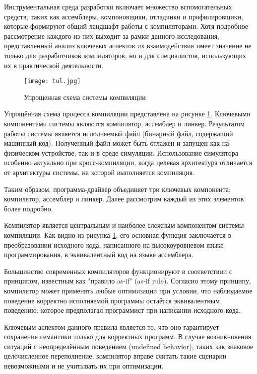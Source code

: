 Инструментальная среда разработки включает множество вспомогательных средств, таких как ассемблеры, компоновщики, отладчики и профилировщики, которые формируют общий ландшафт работы с компиляторами. Хотя подробное рассмотрение каждого из них выходит за рамки данного исследования, представленный анализ ключевых аспектов их взаимодействия имеет значение не только для разработчиков компиляторов, но и для специалистов, использующих их в практической деятельности.

\begin{figure}[H]
	\centering
	\texttt{[image: tul.jpg]}
	\caption{Упрощенная схема системы компиляции}
	\label{fig:tulchain}
\end{figure}

Упрощённая схема процесса компиляции представлена на рисунке \ref{fig:tulchain}. Ключевыми компонентами системы являются компилятор, ассемблер и линкер. Результатом работы системы является исполняемый файл (бинарный файл, содержащий машинный код). Полученный файл может быть отлажен и запущен как на физическом устройстве, так и в среде симуляции. Использование симулятора особенно актуально при кросс-компиляции, когда целевая архитектура отличается от архитектуры системы, на которой выполняется компиляция.

Таким образом, программа-драйвер объединяет три ключевых компонента: компилятор, ассемблер и линкер. Далее рассмотрим каждый из этих элементов более подробно.

Компилятор является центральным и наиболее сложным компонентом системы компиляции. Как видно из рисунка \ref{fig:tulchain}, его основная функция заключается в преобразовании исходного кода, написанного на высокоуровневом языке программирования, в эквивалентный код на языке ассемблера. 

Большинство современных компиляторов функционируют в соответствии с принципом, известным как "правило as-if" (as-if rule). Согласно этому принципу, компилятор может применять любые оптимизации при условии, что наблюдаемое поведение корректно исполняемой программы остаётся эквивалентным поведению, которое предполагал программист при написании исходного кода.

Ключевым аспектом данного правила является то, что оно гарантирует сохранение семантики только для корректных программ. В случае возникновения ситуаций с неопределённым поведением (undefined behavior), таких как знаковое целочисленное переполнение, компилятор вправе считать такие сценарии невозможными и не учитывать их при оптимизации.

